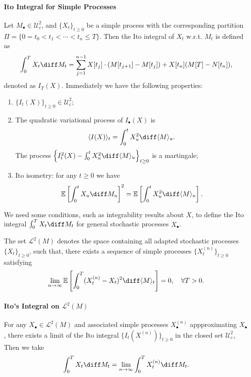 \paragraph{Ito Integral for Simple Processes}
Let $M_{\bullet}\in\mathcal{U}_c^2$, and $\{X_t\}_{t\ge0}$ be a simple process with the corresponding partition $\Pi=\{0=t_0<t_1<\cdots<t_n\le T\}$.
Then the Ito integral of $X_t$ w.r.t. $M_t$ is defined as
\[
\int_0^TX_t\diff M_t = \sum_{j=1}^{n-1}X[t_j]\cdot(M[t_{j+1}] - M[t_j]) + X[t_n](M[T] - N[t_n]),
\]
denoted as $I_T(X)$.
Immediately we have the following properties:
\begin{enumerate}
\item
$\{I_t(X)\}_{t\ge0}\in\mathcal{U}_c^2$;
\item
The quadratic variational process of $I_{\bullet}(X)$ is 
\[
\langle I(X)\rangle_t = \int_0^tX_u^2\diff\langle M\rangle_u.
\]
The process $\left\{
I_t^2(X) - \int_0^tX_u^2\diff\langle M\rangle_u
\right\}_{t\ge0}$ is a martingale;
\item
Ito isometry: for any $t\ge0$ we have
\[
\mathbb{E}\left[
\int_0^tX_u\diff M_u
\right]^2 = \mathbb{E}\left[
\int_0^tX_u^2\diff\langle M\rangle_u
\right].
\]
\end{enumerate}

We need some conditions, such as integrability results about $X$, to define the Ito integral $\int_0^TX_t\diff M_t$ for general stochastic processes $X_{\bullet}$.

\begin{definition}
The set $\mathcal{L}^2(M)$ denotes the space containing all adapted stochastic processes $\{X_t\}_{t\ge0}$, such that, there exists a sequence of simple processes $\{X_t^{(n)}\}_{t\ge0}$ satisfying
\[
\lim_{n\to\infty}\mathbb{E}\left[
\int_0^T(X_t^{(n)}-X_t)^2\diff\langle M\rangle_t
\right]=0,\quad \forall T>0.
\]
\end{definition}
\paragraph{Ito's Integral on $\mathcal{L}^2(M)$}
For any $X_{\bullet}\in\mathcal{L}^2(M)$ and associated simple processes $X^{(n)}_{\bullet}$ appproximating $X_{\bullet}$, there exists a limit of the Ito integral $\{I_t(X^{(n)})\}_{t\ge0}$ in the closed set $\mathcal{U}_c^2$,
Then we take 
\[
\int_0^TX_t\diff M_t = \lim_{n\to\infty}\int_0^TX_t^{(n)}\diff M_t.
\]
